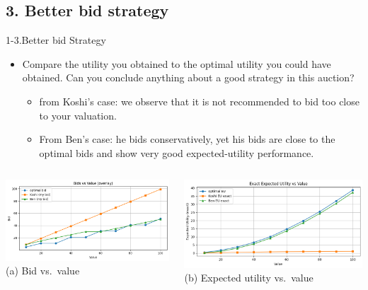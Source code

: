 \documentclass{beamer}
\begin{document}
\subsection{3. Better bid strategy}
\begin{frame}{1-3.Better bid Strategy}
\begin{itemize}
    \item Compare the utility you obtained to the optimal utility you could have obtained.  Can you conclude anything about a good strategy in this auction?
    \begin{itemize}
        \item from Koshi's case: we observe that it is not recommended to bid too close to your valuation.
        \item From Ben's case: he bids conservatively, yet his bids are close to the optimal bids and show very good expected-utility performance.
        \end{itemize}
\end{itemize}
\vspace{0.5em}
\begin{columns}[t]
  \begin{column}{0.48\textwidth}
    \centering
    \includegraphics[width=\linewidth]{332Project1/figures/bid_revised.png}
    \vspace{0.4em}
    {\footnotesize (a) Bid vs.\ value}
  \end{column}
  \begin{column}{0.48\textwidth}
    \centering
    \includegraphics[width=\linewidth]{332Project1/figures/EU_revised.png}
    \vspace{0.4em}
    {\footnotesize (b) Expected utility vs.\ value}
  \end{column}
\end{columns}
\end{frame}
\end{document}
